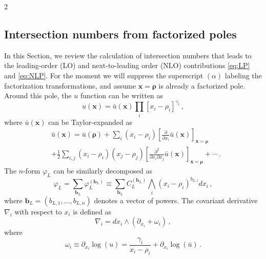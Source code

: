 \documentclass[fleqn]{2023SCGE}
\newcommand{\nn}{\nonumber}
\begin{document}
\begin{multicols}{2}
\begin{appendix}








\section{Intersection numbers from factorized poles} \label{app1}

In this Section, we review the calculation of intersection numbers that leads to the leading-order (LO) and next-to-leading order (NLO) contributions \eqref{eq:LP} and \eqref{eq:NLP}. For the moment we will suppress the superscript $(\alpha)$ labeling the factorization transformations, and assume $\bm{x} = \bm{\rho}$ is already a factorized pole. Around this pole, the $u$ function can be written as
\begin{equation}
u(\bm{x}) = \bar{u}(\bm{x}) \prod_i \left[ x_i - \rho_i \right]^{\gamma_i} \,,
\end{equation}
where $\bar{u}(\bm{x})$ can be Taylor-expanded as
\begin{align}
&\bar{u}(\bm{x}) = \bar{u}(\bm{\rho}) + \sum_i (x_i - \rho_i) \left[ \frac{\partial}{\partial x_i} \bar{u}(\bm{x}) \right]_{\bm{x} = \bm{\rho}} \nn\\
&+ \frac{1}{2} \sum_{i,j} (x_i - \rho_i) (x_j - \rho_j) \left[ \frac{\partial^2}{\partial x_i \partial x_j} \bar{u}(\bm{x}) \right]_{\bm{x} = \bm{\rho}} + \cdots \, .
\end{align}
The $n$-form $\varphi_L$ can be similarly decomposed as
\begin{equation}
\varphi_L = \sum_{\bm{b}_L} \varphi_L^{(\bm{b}_L)} \equiv \sum_{\bm{b}_L} C_L^{(\bm{b}_L)} \bigwedge_i \left( x_i - \rho_i \right)^{b_{L,i}} dx_i \, ,
\end{equation}
where $\bm{b}_L = (b_{L,1},\ldots,b_{L,n})$ denotes a vector of powers.
The covariant derivative $\nabla_i$ with respect to $x_i$ is defined as
\begin{equation}
    \nabla_i = dx_i \wedge (\partial_{x_i} + \omega_i) \, ,
\end{equation}
where
\begin{equation}
    \omega_i \equiv \partial_{x_i} \log(u) = \frac{\gamma_i}{x_i - \rho_i} + \partial_{x_i} \log(\bar{u}) \, .
\end{equation}


\end{appendix}
\end{multicols}
\end{document}
